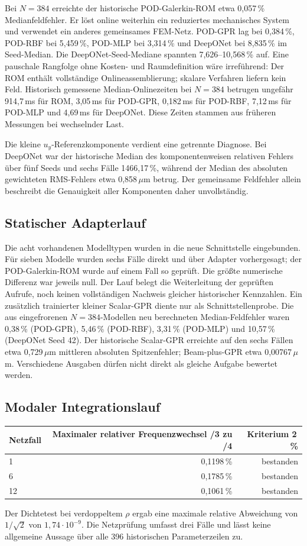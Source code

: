 \documentclass[11pt,a4paper]{article}
\begin{document}
Bei $N=384$ erreichte der historische POD-Galerkin-ROM etwa 0,057\,\% Medianfeldfehler. Er löst online weiterhin ein reduziertes mechanisches System und verwendet ein anderes gemeinsames FEM-Netz. POD-GPR lag bei 0,384\,\%, POD-RBF bei 5,459\,\%, POD-MLP bei 3,314\,\% und DeepONet bei 8,835\,\% im Seed-Median. Die DeepONet-Seed-Mediane spannten 7,626--10,568\,\% auf. Eine pauschale Rangfolge ohne Kosten- und Raumdefinition wäre irreführend: Der ROM enthält vollständige Onlineassemblierung; skalare Verfahren liefern kein Feld. Historisch gemessene Median-Onlinezeiten bei $N=384$ betrugen ungefähr 914,7\,ms für ROM, 3,05\,ms für POD-GPR, 0,182\,ms für POD-RBF, 7,12\,ms für POD-MLP und 4,69\,ms für DeepONet. Diese Zeiten stammen aus früheren Messungen bei wechselnder Last.

Die kleine $u_y$-Referenzkomponente verdient eine getrennte Diagnose. Bei DeepONet war der historische Median des komponentenweisen relativen Fehlers über fünf Seeds und sechs Fälle 1466,17\,\%, während der Median des absoluten gewichteten RMS-Fehlers etwa 0,858\,$\mu$m betrug. Der gemeinsame Feldfehler allein beschreibt die Genauigkeit aller Komponenten daher unvollständig.

\subsection{Statischer Adapterlauf}
Die acht vorhandenen Modelltypen wurden in die neue Schnittstelle eingebunden. Für sieben Modelle wurden sechs Fälle direkt und über Adapter vorhergesagt; der POD-Galerkin-ROM wurde auf einem Fall so geprüft. Die größte numerische Differenz war jeweils null. Der Lauf belegt die Weiterleitung der geprüften Aufrufe, noch keinen vollständigen Nachweis gleicher historischer Kennzahlen. Ein zusätzlich trainierter kleiner Scalar-GPR diente nur als Schnittstellenprobe. Die aus eingefrorenen $N=384$-Modellen neu berechneten Median-Feldfehler waren 0,38\,\% (POD-GPR), 5,46\,\% (POD-RBF), 3,31\,\% (POD-MLP) und 10,57\,\% (DeepONet Seed 42). Der historische Scalar-GPR erreichte auf den sechs Fällen etwa 0,729\,$\mu$m mittleren absoluten Spitzenfehler; Beam-plus-GPR etwa 0,00767\,$\mu$m. Verschiedene Ausgaben dürfen nicht direkt als gleiche Aufgabe bewertet werden.

\subsection{Modaler Integrationslauf}
\begin{center}
\begin{tabular}{lrr}
\toprule
Netzfall & Maximaler relativer Frequenzwechsel /3 zu /4 & Kriterium 2\,\%\\
\midrule
1 & 0,1198\,\% & bestanden\\
6 & 0,1785\,\% & bestanden\\
12 & 0,1061\,\% & bestanden\\
\bottomrule
\end{tabular}
\end{center}
Der Dichtetest bei verdoppeltem $\rho$ ergab eine maximale relative Abweichung von $1/\sqrt2$ von $1{,}74\cdot10^{-9}$. Die Netzprüfung umfasst drei Fälle und lässt keine allgemeine Aussage über alle 396 historischen Parameterzeilen zu.
\end{document}
